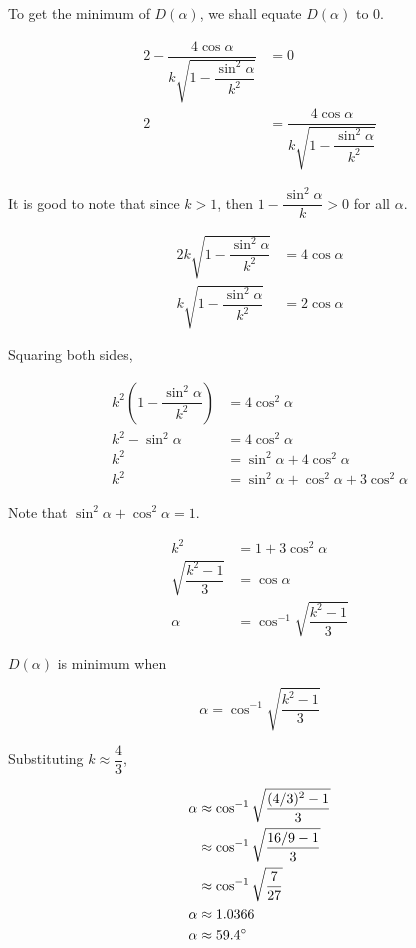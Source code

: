 \documentclass[a4paper,12pt]{article}
\begin{document}
To get the minimum of $D(\alpha)$, we shall equate $D(\alpha)$ to $0$.

\begin{align}
2 - \dfrac{4 \cos \alpha}{k \sqrt{1 -  \dfrac{\sin^2 \alpha}{k^2}}} &= 0 \nonumber\\
2 &=  \dfrac{4 \cos \alpha}{k \sqrt{1 -  \dfrac{\sin^2 \alpha}{k^2}}}
\end{align}

It is good to note that since $k>1$, then $1-\dfrac{\sin^2 \alpha}{k} >0$ for all $\alpha$.

\begin{align}
2 k \sqrt{1 -  \dfrac{\sin^2 \alpha}{k^2}} &= 4 \cos \alpha \nonumber\\
k \sqrt{1 -  \dfrac{\sin^2 \alpha}{k^2}} &= 2\cos \alpha
\end{align}

Squaring both sides,

\begin{align}
k^2 \left(1 -  \dfrac{\sin^2 \alpha}{k^2} \right) &= 4 \cos^2 \alpha \nonumber\\
k^2 - \sin^2 \alpha &= 4 \cos^2 \alpha \nonumber\\
k^2 &= \sin^2 \alpha + 4 \cos^2 \alpha \nonumber\\
k^2 &= \sin^2 \alpha + \cos^2 \alpha + 3\cos^2 \alpha 
\end{align}

Note that $\sin^2 \alpha + \cos^2 \alpha = 1$.

\begin{align}
k^2 &= 1 + 3\cos^2 \alpha \nonumber\\
\sqrt{\dfrac{k^2 -1}{3}} &= \cos \alpha \nonumber\\
\alpha &=  \cos^{-1} \sqrt{\dfrac{k^2 -1}{3}}
\end{align}

$D(\alpha)$ is minimum when 

\begin{equation}\label{min}
\alpha =  \cos^{-1} \sqrt{\dfrac{k^2 -1}{3}}
\end{equation}

Substituting $k \approx \dfrac{4}{3}$,

\begin{align*}
\alpha &\approx  \cos^{-1} \sqrt{\dfrac{(4/3 )^2 -1}{3}} \\
&\approx \cos^{-1} \sqrt{\dfrac{16/9 -1}{3}}\\
&\approx \cos^{-1} \sqrt{\dfrac{7}{27}}\\
\alpha &\approx 1.0366\\
\alpha &\approx 59.4 \degree
\end{align*}
\end{document}
